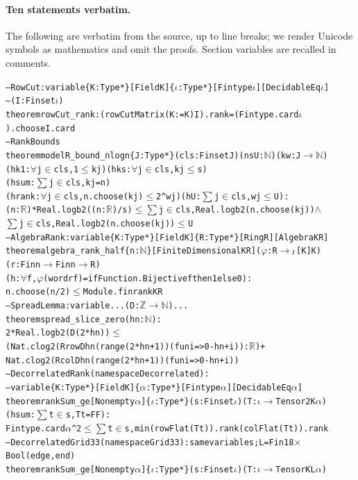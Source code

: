 \documentclass[10pt]{amsart}
\theoremstyle{plain}
\theoremstyle{definition}
\theoremstyle{remark}
\numberwithin{equation}{section}
\begin{document}
\paragraph{Ten statements verbatim.} The following are verbatim from the source, up to line breaks;
we render Unicode symbols as mathematics and omit the proofs. Section variables are recalled in
comments.
\begin{alltt}\footnotesize
-- RowCut: variable \{K : Type*\} [Field K] \{\(\iota\) : Type*\} [Fintype \(\iota\)] [DecidableEq \(\iota\)]
--   (I : Finset \(\iota\))
theorem rowCut_rank : (rowCutMatrix (K := K) I).rank = (Fintype.card \(\iota\)).choose I.card
-- RankBounds
theorem modelR_bound_nlogn \{J : Type*\} (cls : Finset J) (n s U : \(\mathbb{N}\)) (k w : J \(\to\) \(\mathbb{N}\))
    (hk1 : \(\forall\) j \(\in\) cls, 1 \(\le\) k j) (hks : \(\forall\) j \(\in\) cls, k j \(\le\) s)
    (hsum : \(\sum\) j \(\in\) cls, k j = n)
    (hrank : \(\forall\) j \(\in\) cls, n.choose (k j) \(\le\) 2 ^ w j) (hU : \(\sum\) j \(\in\) cls, w j \(\le\) U) :
    (n : \(\mathbb{R}\)) * Real.logb 2 ((n : \(\mathbb{R}\)) / s) \(\le\) \(\sum\) j \(\in\) cls, Real.logb 2 (n.choose (k j)) \(\wedge\)
      \(\sum\) j \(\in\) cls, Real.logb 2 (n.choose (k j)) \(\le\) U
-- AlgebraRank: variable \{K : Type*\} [Field K] \{R : Type*\} [Ring R] [Algebra K R]
theorem algebra_rank_half \{n : \(\mathbb{N}\)\} [FiniteDimensional K R] (\(\varphi\) : R \(\to\)\(\sb{l}\)[K] K)
    (r : Fin n \(\to\) Fin n \(\to\) R)
    (h : \(\forall\) f, \(\varphi\) (word r f) = if Function.Bijective f then 1 else 0) :
    n.choose (n / 2) \(\le\) Module.finrank K R
-- SpreadLemma: variable ... (D : \(\mathbb{Z}\) \(\to\) \(\mathbb{N}\)) ...
theorem spread_slice_zero (hn : \(\mathbb{N}\)) :
    2 * Real.logb 2 (D (2 * hn)) \(\le\)
      (Nat.clog 2 (Rrow D hn (range (2 * hn + 1)) (fun i => 0 - hn + i)) : \(\mathbb{R}\)) +
        Nat.clog 2 (Rcol D hn (range (2 * hn + 1)) (fun i => 0 - hn + i))
-- DecorrelatedRank (namespace Decorrelated):
--   variable \{K : Type*\} [Field K] \{\(\alpha\) : Type*\} [Fintype \(\alpha\)] [DecidableEq \(\alpha\)]
theorem rankSum_ge [Nonempty \(\alpha\)] \{\(\iota\) : Type*\} (s : Finset \(\iota\)) (T : \(\iota\) \(\to\) Tensor2 K \(\alpha\))
    (hsum : \(\sum\) t \(\in\) s, T t = FF) :
    Fintype.card \(\alpha\) ^ 2 \(\le\) \(\sum\) t \(\in\) s, min (rowFlat (T t)).rank (colFlat (T t)).rank
-- DecorrelatedGrid33 (namespace Grid33): same variables; L = Fin 18 \(\times\) Bool (edge, end)
theorem rankSum_ge [Nonempty \(\alpha\)] \{\(\iota\) : Type*\} (s : Finset \(\iota\)) (T : \(\iota\) \(\to\) Tensor K L \(\alpha\))

\end{alltt}
\end{document}
